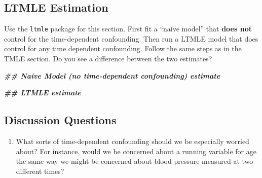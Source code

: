 \documentclass[
]{article}
\newenvironment{Shaded}{\begin{snugshade}}{\end{snugshade}}
\newcommand{\DocumentationTok}[1]{\textcolor[rgb]{0.56,0.35,0.01}{\textbf{\textit{#1}}}}
\begin{document}

\hypertarget{ltmle-estimation-1}{%
\subsection{LTMLE Estimation}\label{ltmle-estimation-1}}

Use the \texttt{ltmle} package for this section. First fit a ``naive
model'' that \textbf{does not} control for the time-dependent
confounding. Then run a LTMLE model that does control for any time
dependent confounding. Follow the same steps as in the TMLE section. Do
you see a difference between the two estimates?

\begin{Shaded}
\begin{Highlighting}[]
\DocumentationTok{\#\# Naive Model (no time{-}dependent confounding) estimate}

\DocumentationTok{\#\# LTMLE estimate}
\end{Highlighting}
\end{Shaded}

\hypertarget{discussion-questions-2}{%
\subsection{Discussion Questions}\label{discussion-questions-2}}

\begin{enumerate}
    \item What sorts of time-dependent confounding should we be especially worried about? For instance, would we be concerned about a running variable for age the same way we might be concerned about blood pressure measured at two different times?
\end{enumerate}
\end{document}
